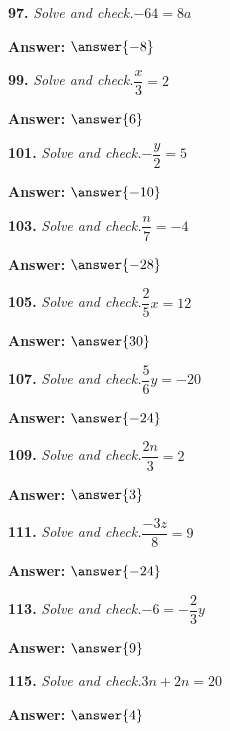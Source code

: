 \documentclass{ximera}
\begin{document}
\begin{problem}
\textbf{97.} \emph{Solve and check.}\quad $-64 = 8a$

\textbf{Answer:} $\answer{-8}$
\end{problem}

\begin{problem}
\textbf{99.} \emph{Solve and check.}\quad $\dfrac{x}{3} = 2$

\textbf{Answer:} $\answer{6}$
\end{problem}

\begin{problem}
\textbf{101.} \emph{Solve and check.}\quad $-\dfrac{y}{2} = 5$

\textbf{Answer:} $\answer{-10}$
\end{problem}

\begin{problem}
\textbf{103.} \emph{Solve and check.}\quad $\dfrac{n}{7} = -4$

\textbf{Answer:} $\answer{-28}$
\end{problem}

\begin{problem}
\textbf{105.} \emph{Solve and check.}\quad $\dfrac{2}{5}x = 12$

\textbf{Answer:} $\answer{30}$
\end{problem}

\begin{problem}
\textbf{107.} \emph{Solve and check.}\quad $\dfrac{5}{6}y = -20$

\textbf{Answer:} $\answer{-24}$
\end{problem}

\begin{problem}
\textbf{109.} \emph{Solve and check.}\quad $\dfrac{2n}{3} = 2$

\textbf{Answer:} $\answer{3}$
\end{problem}

\begin{problem}
\textbf{111.} \emph{Solve and check.}\quad $\dfrac{-3z}{8} = 9$

\textbf{Answer:} $\answer{-24}$
\end{problem}

\begin{problem}
\textbf{113.} \emph{Solve and check.}\quad $-6 = -\dfrac{2}{3}y$

\textbf{Answer:} $\answer{9}$
\end{problem}

\begin{problem}
\textbf{115.} \emph{Solve and check.}\quad $3n + 2n = 20$

\textbf{Answer:} $\answer{4}$
\end{problem}
\end{document}
